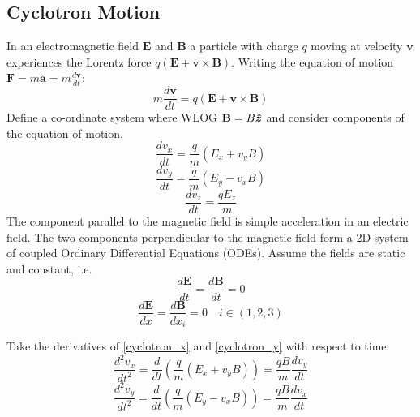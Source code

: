 \subsection{Cyclotron Motion}
In an electromagnetic field $\textbf{E}$ and $\textbf{B}$ a particle with charge $q$ moving at velocity $\textbf{v}$ experiences the Lorentz force $q(\textbf{E}+\textbf{v}\times\textbf{B})$. Writing the equation of motion $\textbf{F}=m\textbf{a}=m\frac{d\textbf{v}}{dt}$:
\begin{equation}
	m\frac{d\textbf{v}}{dt}=q(\textbf{E}+\textbf{v}\times\textbf{B})
\end{equation}
Define a co-ordinate system where WLOG $\textbf{B}=B\bm{\hat{z}}$ and consider components of the equation of motion.
\begin{equation}\label{cyclotron_x}
	\frac{dv_x}{dt}=\frac{q}{m}(E_x+v_yB)
\end{equation}
\begin{equation}\label{cyclotron_y}
	\frac{dv_y}{dt}=\frac{q}{m}(E_y-v_xB)
\end{equation}
\begin{equation}
	\frac{dv_z}{dt}=\frac{qE_z}{m}
\end{equation}
The component parallel to the magnetic field is simple acceleration in an electric field. The two components perpendicular to the magnetic field form a 2D system of coupled Ordinary Differential Equations (ODEs). Assume the fields are static and constant, i.e.
\begin{equation}
	\frac{d\textbf{E}}{dt}=\frac{d\textbf{B}}{dt}=0
\end{equation}
\begin{equation}
	\frac{d\textbf{E}}{dx}=\frac{d\textbf{B}}{dx_i}=0  \quad i \in (1,2,3)
\end{equation}

Take the derivatives of \eqref{cyclotron_x} and \eqref{cyclotron_y} with respect to time
\begin{equation}
	\frac{d^2v_x}{dt^2}=\frac{d}{dt}\left(\frac{q}{m}(E_x+v_yB)\right)=\frac{qB}{m}\frac{dv_y}{dt}
\end{equation}
\begin{equation}
	\frac{d^2v_y}{dt^2}=\frac{d}{dt}\left(\frac{q}{m}(E_y-v_xB)\right)=\frac{qB}{m}\frac{dv_x}{dt}
\end{equation}

